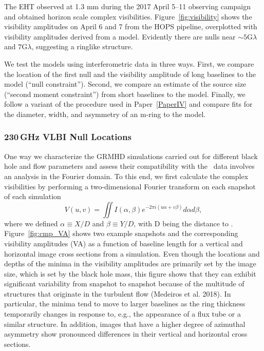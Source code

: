 The EHT observed \sgra at 1.3 mm during the 2017 April 5--11 observing campaign and obtained horizon scale complex visibilities.  Figure~\ref{fig:visibility} shows the visibility amplitudes on April 6 and 7 from  the HOPS pipeline, overplotted with visibility amplitudes derived from a model.  Evidently there are nulls near $\sim 5\mathrm{G}\lambda$ and $7\mathrm{G}\lambda$, suggesting a ringlike structure.

We test the models using interferometric data in three ways.  First, we compare the location of the first null and the visibility amplitude of long baselines to the model (``null constraint'').  Second, we compare an estimate of the source size (``second moment constraint'') from short baselines to the model.  Finally, we follow a variant of the procedure used in Paper~\ref{PaperIV} and compare fits for the diameter, width, and asymmetry of an m-ring to the model.  

\subsubsection{230\,GHz VLBI Null Locations}


One way we characterize the GRMHD simulations carried out for
different black hole and flow parameters and assess their
compatibility with the \sgra\ data involves an analysis in the Fourier
domain.
To this end, we first calculate the complex visibilities by performing
a two-dimensional Fourier transform on each snapshot of each
simulation
\begin{equation}
  V(u,v) = \iint I(\alpha,\beta) e^{-2\pi i(u\alpha+v\beta)}d\alpha d\beta,
\end{equation}
where we defined $\alpha \equiv X/D$ and $\beta \equiv Y/D$, with D
being the distance to \sgra.
Figure~\ref{fig:cmp_VA} shows two example snapshots and the
corresponding visibility amplitudes (VA) as a function of baseline
length for a vertical and horizontal image cross sections from a
simulation.
Even though the locations and depths of the minima in the visibility
amplitudes are primarily set by the image size, which is set by the
black hole mass, this figure shows that they can exhibit significant
variability from snapshot to snapshot because of the multitude of
structures that originate in the turbulent flow (Medeiros et
al. 2018).
In particular, the minima tend to move to larger baselines as the ring
thickness temporarily changes in response to, e.g., the appearance of
a flux tube or a similar structure.
In addition, images that have a higher degree of azimuthal asymmetry
show pronounced differences in their vertical and horizontal cross
sections.

